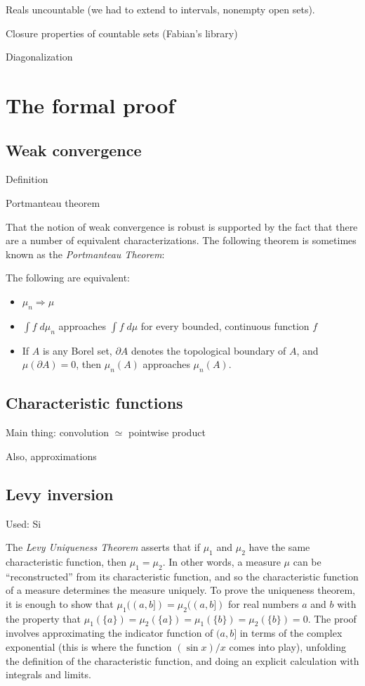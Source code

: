 \documentclass{svjour3}
\newcommand{\todo}[1]{{\color{red}#1}}
\begin{document}
\todo{
Reals uncountable (we had to extend to intervals, nonempty open sets).

Closure properties of countable sets (Fabian's library)

Diagonalization 
}

\section{The formal proof}
\label{section:formal}

\subsection{Weak convergence}
\label{subsection:weak:convergence}

\todo{
Definition

Portmanteau theorem

That the notion of weak convergence is robust is supported by the fact that there are a number of equivalent characterizations. The following theorem is sometimes known as the \emph{Portmanteau Theorem}:
\begin{theorem}
The following are equivalent:
\begin{itemize}
 \item $\mu_n \Rightarrow \mu$
 \item $\int f \; d\mu_n$ approaches $\int f \; d\mu$ for every bounded, continuous function $f$
 \item If $A$ is any Borel set, $\partial A$ denotes the topological boundary of $A$, and $\mu(\partial A) = 0$, then $\mu_n(A)$ approaches $\mu_n(A)$. 
\end{itemize}
\end{theorem}

}

\subsection{Characteristic functions}

\todo{
Main thing: convolution $\simeq$ pointwise product

Also, approximations
}

\subsection{Levy inversion}

\todo{
Used: Si

The \emph{Levy Uniqueness Theorem} asserts that if $\mu_1$ and $\mu_2$ have the same characteristic function, then $\mu_1 = \mu_2$. In other words, a measure $\mu$ can be ``reconstructed'' from its characteristic function, and so the characteristic function of a measure determines the measure uniquely. To prove the uniqueness theorem, it is enough to show that $\mu_1((a,b]) = \mu_2((a,b])$ for real numbers $a$ and $b$ with the property that $\mu_1(\{a\}) = \mu_2(\{a\}) = \mu_1(\{b\}) = \mu_2(\{b\}) = 0$. The proof involves approximating the indicator function of $(a,b]$ in terms of the complex exponential (this is where the function $(\sin x) / x$ comes into play), unfolding the definition of the characteristic function, and doing an explicit calculation with integrals and limits.
}
\end{document}
